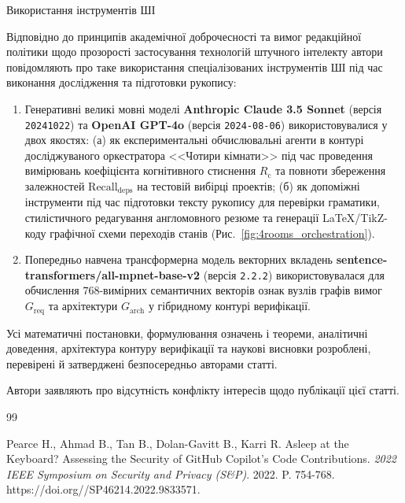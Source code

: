 \documentclass[12pt, reqno, a4paper]{amsart}
\theoremstyle{definition}
\theoremstyle{plain}
\theoremstyle{plain}
\theoremstyle{plain}
\theoremstyle{remark}
\theoremstyle{plain}
\begin{document}
{\begin{Head}
Використання інструментів ШІ
\end{Head}

Відповідно до принципів академічної доброчесності та вимог редакційної політики щодо прозорості застосування технологій штучного інтелекту автори повідомляють про таке використання спеціалізованих інструментів ШІ під час виконання дослідження та підготовки рукопису:
\begin{enumerate}
\item Генеративні великі мовні моделі \textbf{Anthropic Claude 3.5 Sonnet} (версія \texttt{20241022}) та \textbf{OpenAI GPT-4o} (версія \texttt{2024-08-06}) використовувалися у двох якостях: (а) як експериментальні обчислювальні агенти в контурі досліджуваного оркестратора <<Чотири кімнати>> під час проведення вимірювань коефіцієнта когнітивного стиснення $R_{\text{c}}$ та повноти збереження залежностей $\text{Recall}_{\text{deps}}$ на тестовій вибірці проектів; (б) як допоміжні інструменти під час підготовки тексту рукопису для перевірки граматики, стилістичного редагування англомовного резюме та генерації LaTeX/TikZ-коду графічної схеми переходів станів (Рис.~\ref{fig:4rooms_orchestration}).
\item Попередньо навчена трансформерна модель векторних вкладень \textbf{sentence-transformers/all-mpnet-base-v2} (версія \texttt{2.2.2}) використовувалася для обчислення $768$-вимірних семантичних векторів ознак вузлів графів вимог $G_{\text{req}}$ та архітектури $G_{\text{arch}}$ у гібридному контурі верифікації.
\end{enumerate}
Усі математичні постановки, формулювання означень і теореми, аналітичні доведення, архітектура контуру верифікації та наукові висновки розроблені, перевірені й затверджені безпосередньо авторами статті.

\bigskip

{\scriptsize
\noindent
Автори заявляють про відсутність конфлікту інтересів щодо публікації цієї статті.
\par}

\bigskip

\begin{thebibliography}{99}\sloppy

 Pearce H., Ahmad B., Tan B., Dolan-Gavitt B., Karri R. Asleep at the Keyboard? Assessing the Security of GitHub Copilot's Code Contributions. \emph{2022 IEEE Symposium on Security and Privacy (S\&P)}. 2022. P. 754-768. https://doi.org//\allowbreak SP46214.2022.9833571.


\end{thebibliography}}
\end{document}

